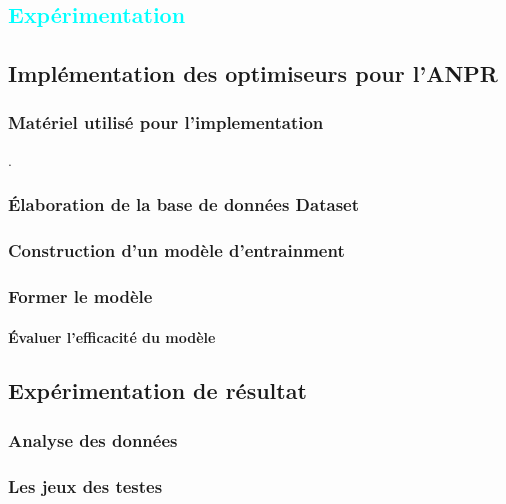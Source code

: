 
%
%

\textcolor{cyan}{\chapter{Expérimentation}}

\section{Implémentation des optimiseurs pour l'ANPR}

	\subsection{Matériel utilisé pour l'implementation}
	\lipsum[1].
	\subsection{Élaboration de la base de données {Dataset}}
	
	\lipsum[1]
	
	\subsection{Construction d'un modèle d'entrainment}
	\subsection{Former le modèle}
	\lipsum[1]
	
	\subsubsection{Évaluer l'efficacité du modèle}
	
	\lipsum[1]
	

\section{Expérimentation de résultat}
	\subsection{Analyse des données } 
	\lipsum[1] 
	\subsection{Les jeux des testes}
	\lipsum[1] 
	
